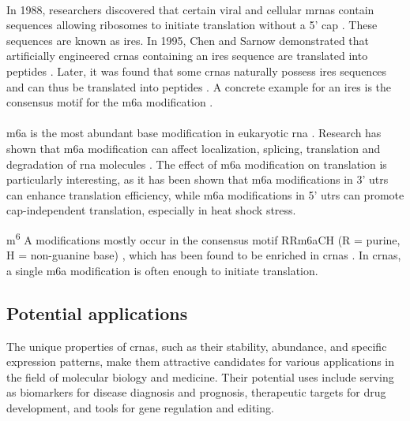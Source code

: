 \paragraph{} In 1988, researchers discovered that certain
viral and cellular \glspl{mrna} contain sequences allowing ribosomes to
initiate translation without a 5' cap \supercite{pelletier_internal_1988,
    jang_segment_1988}.
These sequences are known as \gls{ires}.
In 1995, Chen and Sarnow demonstrated that artificially engineered \glspl{crna}
containing an \gls{ires} sequence are translated into peptides
\supercite{chen_initiation_1995}.
Later, it was found that some \glspl{crna} naturally possess \gls{ires}
sequences and can thus be translated into peptides
\supercite{chen_expanding_2020,legnini_circ-znf609_2017,pamudurti_translation_2017}.
A concrete example for an \gls{ires} is the consensus motif for the \gls{m6a}
modification \supercite{yang_extensive_2017}.

\paragraph{}
\Gls{m6a} is the most abundant base modification in eukaryotic \gls{rna}
\supercite{yang_extensive_2017,li_pivotal_2014,wei_methylated_1975}.
Research has shown that \gls{m6a} modification can affect localization,
splicing, translation and degradation of \gls{rna} molecules
\supercite{yue_rna_2015,meyer_dynamic_2014}.
The effect of \gls{m6a} modification on translation is particularly
interesting, as it has been shown that \gls{m6a} modifications in 3'
\glspl{utr} can enhance translation
efficiency\supercite{wang_n6-methyladenosine_2015}, while \gls{m6a}
modifications in 5' \glspl{utr} can promote cap-independent translation,
especially in heat shock stress\supercite{zhou_dynamic_2015,meyer_5_2015}.

m\textsuperscript{6}
A modifications mostly occur in the consensus motif RR\gls{m6a}CH (R = purine,
H = non-guanine base) \supercite{csepany_sequence_1990,harper_sequence_1990},
which has been found to be enriched in \glspl{crna}
\supercite{yang_extensive_2017}.
In \glspl{crna}, a single \gls{m6a} modification is often enough to initiate
translation\supercite{yang_extensive_2017}.

\subsection{Potential applications}
\label{sec:circrna_applications}
The unique properties of \glspl{crna}, such as their stability, abundance, and
specific expression patterns, make them attractive candidates for various
applications in the field of molecular biology and medicine.
Their potential uses include serving as biomarkers for disease diagnosis and
prognosis, therapeutic targets for drug development, and tools for gene
regulation and editing.

